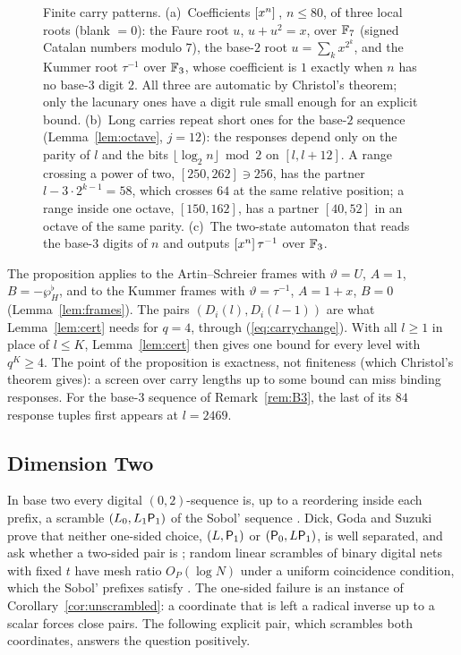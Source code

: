 \begin{figure}[t]
\centering
{}
\caption{Finite carry patterns. (a)~Coefficients $[x^{n}]\,$, $n\le80$, of three local roots (blank $=0$): the Faure root $u$, $u+u^2=x$, over $\mathbb{F}_7$ (signed Catalan numbers modulo $7$), the base-$2$ root $u=\sum_kx^{2^k}$, and the Kummer root $\tau^{-1}$ over $\mathbb{F}_3$, whose coefficient is $1$ exactly when $n$ has no base-$3$ digit $2$. All three are automatic by Christol's theorem; only the lacunary ones have a digit rule small enough for an explicit bound. (b)~Long carries repeat short ones for the base-$2$ sequence (Lemma~\ref{lem:octave}, $j=12$): the responses depend only on the parity of $l$ and the bits $\lfloor\log_2n\rfloor\bmod2$ on $[l,l+12]$. A range crossing a power of two, $[250,262]\ni256$, has the partner $l-3\cdot2^{k-1}=58$, which crosses $64$ at the same relative position; a range inside one octave, $[150,162]$, has a partner $[40,52]$ in an octave of the same parity. (c)~The two-state automaton that reads the base-$3$ digits of $n$ and outputs $[x^{n}]\,\tau^{-1}$ over $\mathbb{F}_3$.}
\label{fig:automaton}
\end{figure}

The proposition applies to the Artin--Schreier frames with $\vartheta=U$, $A=1$, $B=-\wp^\flat_H$, and to the Kummer frames with $\vartheta=\tau^{-1}$, $A=1+x$, $B=0$ (Lemma~\ref{lem:frames}). The pairs $(D_i(l),D_i(l-1))$ are what Lemma~\ref{lem:cert} needs for $q=4$, through (\ref{eq:carrychange}). With all $l\ge1$ in place of $l\le K$, Lemma~\ref{lem:cert} then gives one bound for every level with $q^K\ge4$. The point of the proposition is exactness, not finiteness (which Christol's theorem gives): a screen over carry lengths up to some bound can miss binding responses. For the base-$3$ sequence of Remark~\ref{rem:B3}, the last of its $84$ response tuples first appears at $l=2469$.

\subsection{Dimension Two}\label{sec:smalltwo}
In base two every digital $(0,2)$-sequence is, up to a reordering inside each prefix, a scramble $(L_0,L_1\mathsf{P}_1)$ of the Sobol' sequence \cite{HS19}. Dick, Goda and Suzuki prove that neither one-sided choice, $(L,\mathsf{P}_1)$ or $(\mathsf{P}_0,L\mathsf{P}_1)$, is well separated, and ask whether a two-sided pair is \cite[Section~4.2]{DGS2}; random linear scrambles of binary digital nets with fixed $t$ have mesh ratio $O_P(\log N)$ under a uniform coincidence condition, which the Sobol' prefixes satisfy \cite[Thm.~5.5, Lem.~4.10]{Suz26}. The one-sided failure is an instance of Corollary~\ref{cor:unscrambled}: a coordinate that is left a radical inverse up to a scalar forces close pairs. The following explicit pair, which scrambles both coordinates, answers the question positively.


